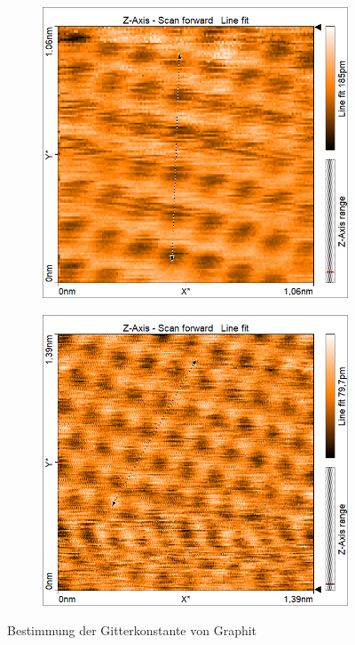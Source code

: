 \begin{figure}[H]
	\begin{subfigure}[c]{0.45\textwidth}
		\includegraphics[width=\textwidth]{Mess/graphit_gitterkonst.png}
	\end{subfigure}
	\begin{subfigure}[c]{0.45\textwidth}
		\includegraphics[width=\textwidth]{Mess/graphit_gitterkonst2.png}
	\end{subfigure}
	\caption{Bestimmung der Gitterkonstante von Graphit}
	\label{graphgit}
\end{figure}

